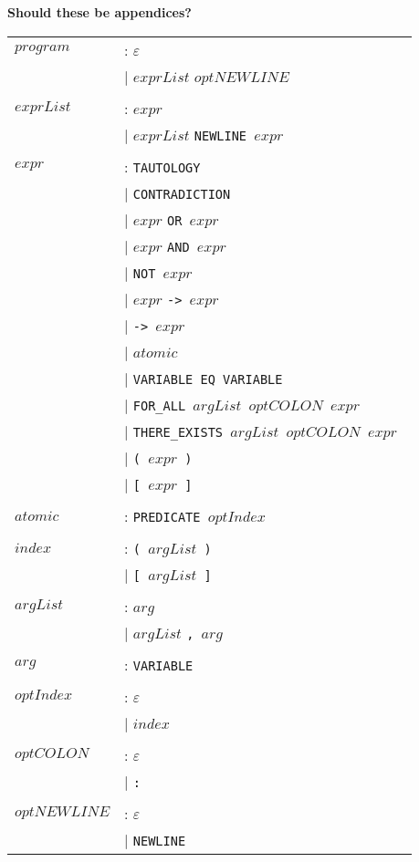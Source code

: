 		\textbf{Should these be appendices?}

		\begin{tabular}{ll}
		$program$ & :    $\varepsilon$ \\
		{} & $\mid$      $exprList$ $optNEWLINE$ \\
		\\

		$exprList$ & :   $expr$ \\
		{} & $\mid$      $exprList$ \tt{NEWLINE} $expr$ \\
		\\

		$expr$ & :       \tt{TAUTOLOGY} \\
		{} & $\mid$      \tt{CONTRADICTION} \\
		{} & $\mid$      $expr$ \tt{OR} $expr$ \\
		{} & $\mid$      $expr$ \tt{AND} $expr$ \\
		{} & $\mid$      \tt{NOT} $expr$ \\
		{} & $\mid$      $expr$ \tt{->} $expr$ \\
		{} & $\mid$      \tt{->} $expr$ \\
		{} & $\mid$      $atomic$ \\
		{} & $\mid$      \tt{VARIABLE EQ VARIABLE} \\
		{} & $\mid$      \tt{FOR\_ALL} $argList$ $optCOLON$ $expr$ \\
		{} & $\mid$      \tt{THERE\_EXISTS} $argList$ $optCOLON$ $expr$ \\
		{} & $\mid$      \tt{(} $expr$ \tt{)} \\
		{} & $\mid$      \tt{[} $expr$ \tt{]} \\
		\\

		$atomic$ & :     \tt{PREDICATE} $optIndex$ \\
		\\

		$index$ & :      \tt{(} $argList$ \tt{)} \\
		{} & $\mid$      \tt{[} $argList$ \tt{]} \\
		\\

		$argList$ & :    $arg$ \\
		{} & $\mid$      $argList$ \tt{,} $arg$ \\
		\\

		$arg$ & :        \tt{VARIABLE} \\
		\\

		$optIndex$ & :   $\varepsilon$ \\
		{} & $\mid$      $index$ \\
		\\

		$optCOLON$ & :   $\varepsilon$ \\
		{} & $\mid$      \tt{:} \\
		\\

		$optNEWLINE$ & : $\varepsilon$ \\
		{} & $\mid$      \tt{NEWLINE}
		\end{tabular}

